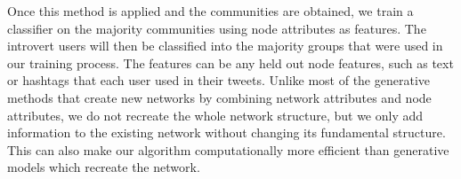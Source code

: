 Once this method is applied and the communities are obtained, we train a classifier on the majority communities using node attributes as features. The introvert users will then be classified into the majority groups that were used in our training process. The features can be any held out node features, such as text or hashtags that each user used in their tweets.
Unlike most of the generative methods that create new networks by combining network attributes and node attributes, we do not recreate the whole network structure, %
but we only add information to the existing network without changing its fundamental structure. This can also make our algorithm computationally more efficient than generative models which recreate the network.
